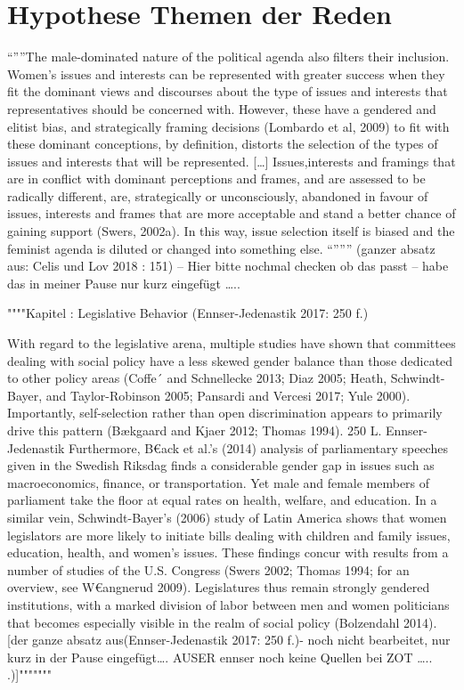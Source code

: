 \documentclass[12pt, 
    twoside=false, 
    bibliography=totoc, 
    numbers=endperiod, 
    headings=normal, 
    toc=chapterentrydotfill
    ]{scrbook}
\begin{document}
\section{Hypothese Themen der Reden}


“””The male-dominated nature of the political agenda also filters their inclusion. Women’s issues and interests can be represented with greater success when they fit the dominant views and discourses about the type of issues and interests that representatives should be concerned with. However, these have a gendered and elitist bias, and strategically framing decisions (Lombardo et al, 2009) to fit with these dominant conceptions, by definition, distorts the selection of the types of issues and interests that will be represented.  […]
Issues,interests and framings that are in conflict with dominant perceptions and frames, and are assessed to be radically different, are, strategically or unconsciously, abandoned in favour of issues, interests and frames that are more acceptable and stand a better chance of gaining support (Swers, 2002a). In this way, issue selection itself is biased and the feminist agenda is diluted or changed into something else. “””” \parencite[151]{celis_2018} (ganzer absatz aus: Celis und Lov 2018  : 151) – Hier bitte nochmal checken ob das passt – habe das in meiner Pause nur kurz eingefügt …..

""""Kapitel : Legislative Behavior (Ennser-Jedenastik 2017: 250 f.)

With regard to the legislative arena, multiple studies have shown that committees
dealing with social policy have a less skewed gender balance than those
dedicated to other policy areas (Coffe´ and Schnellecke 2013; Diaz 2005; Heath,
Schwindt-Bayer, and Taylor-Robinson 2005; Pansardi and Vercesi 2017; Yule
2000). Importantly, self-selection rather than open discrimination appears to
primarily drive this pattern (Bækgaard and Kjaer 2012; Thomas 1994).
250 L. Ennser-Jedenastik Furthermore, B€ack et al.’s (2014) analysis of parliamentary speeches given
in the Swedish Riksdag finds a considerable gender gap in issues such as
macroeconomics, finance, or transportation. Yet male and female members of
parliament take the floor at equal rates on health, welfare, and education. In a
similar vein, Schwindt-Bayer’s (2006) study of Latin America shows that
women legislators are more likely to initiate bills dealing with children and
family issues, education, health, and women’s issues. These findings concur
with results from a number of studies of the U.S. Congress (Swers 2002;
Thomas 1994; for an overview, see W€angnerud 2009). Legislatures thus remain
strongly gendered institutions, with a marked division of labor between
men and women politicians that becomes especially visible in the realm of social
policy (Bolzendahl 2014). [der ganze absatz aus(Ennser-Jedenastik 2017: 250 f.)- noch nicht bearbeitet, nur kurz in der Pause eingefügt…. AUSER ennser noch keine Quellen bei ZOT ….. .)]"""""""
\end{document}
